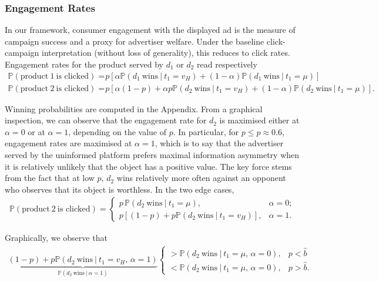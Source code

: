 \subsubsection{Engagement Rates}

\noindent In our framework, consumer engagement with the displayed ad is the measure of campaign success and a proxy for advertiser welfare. Under the baseline click-campaign interpretation (without loss of generality), this reduces to click rates. Engagement rates for the product served by $d_1$ or $d_2$ read respectively
\begin{align*}
    \mathbb{P} (\text{product} \ 1 \ \text{is clicked}) =& p \left[  \alpha \mathbb{P}(d_1 \ \text{wins}\ | \ t_1 = v_H) + (1-\alpha)  \mathbb{P}(d_1 \ \text{wins}\ | \ t_1 = \mu) \right] \\[5pt]
    \mathbb{P} (\text{product} \ 2 \ \text{is clicked}) =& p \left[ \alpha (1 - p) + \alpha p \mathbb{P}(d_2 \ \textrm{wins} \ | \ t_1 = v_H) + (1 - \alpha) \mathbb{P}(d_2 \ \textrm{wins} \ | \ t_1 = \mu)  \right].
\end{align*}

\noindent Winning probabilities are computed in the Appendix. From a graphical inspection, we can observe that the engagement rate for $d_2$ is maximised either at $\alpha = 0$ or at $\alpha = 1$, depending on the value of $p$. In particular, for $p \leq \hat{p} \approx 0.6$, engagement rates are maximised at $\alpha = 1$, which is to say that the advertiser served by the uninformed platform prefers maximal information asymmetry when it is relatively unlikely that the object has a positive value. The key force stems from the fact that at low $p$, $d_2$ wins relatively more often against an opponent who observes that its object is worthless. In the two edge cases,
\begin{align*}
    \mathbb{P}(\text{product} \ 2 \ \text{is clicked}) = \begin{cases}
        p \,  \mathbb{P}(d_2 \ \textrm{wins} \ | \ t_1 = \mu),  & \alpha = 0; \\[5pt]
        p \left[(1 - p) + p \mathbb{P}(d_2 \ \textrm{wins} \ | \ t_1 = v_H)  \right], & \alpha = 1.
    \end{cases}
\end{align*}

\noindent Graphically, we observe that
\begin{align*}
    \underbrace{(1 - p) + p \mathbb{P}(d_2 \ \textrm{wins} \ | \ t_1 = v_H, \, \alpha = 1)}_{\mathbb{P}(d_2 \ \textrm{wins} \ | \ \alpha = 1)} \begin{cases}
        > \mathbb{P}(d_2 \ \textrm{wins} \ | \ t_1 = \mu, \, \alpha = 0), & p < \hat{b} \\[5pt]
        < \mathbb{P}(d_2 \ \textrm{wins} \ | \ t_1 = \mu,\, \alpha = 0), & p > \hat{b}.
    \end{cases}
\end{align*}

